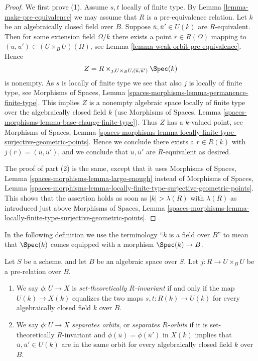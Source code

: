 \begin{proof}
We first prove (1). Assume $s, t$ locally of finite type. By
Lemma \ref{lemma-make-pre-equivalence}
we may assume that $R$ is a pre-equivalence relation.
Let $k$ be an algebraically closed field over $B$.
Suppose $\overline{u}, \overline{u}' \in U(k)$ are $R$-equivalent.
Then for some extension field $\Omega/k$ there exists
a point $\overline{r} \in R(\Omega)$ mapping to
$(\overline{u}, \overline{u}') \in (U \times_B U)(\Omega)$, see
Lemma \ref{lemma-weak-orbit-pre-equivalence}.
Hence
$$
Z = R \times_{j, U \times_B U, (\overline{u}, \overline{u}')} \Spec(k)
$$
is nonempty. As $s$ is locally of finite type we see that
also $j$ is locally of finite type, see
Morphisms of Spaces, Lemma \ref{spaces-morphisms-lemma-permanence-finite-type}.
This implies $Z$ is a nonempty algebraic space locally of finite type
over the algebraically closed field $k$ (use
Morphisms of Spaces,
Lemma \ref{spaces-morphisms-lemma-base-change-finite-type}).
Thus $Z$ has a $k$-valued point, see
Morphisms of Spaces, Lemma
\ref{spaces-morphisms-lemma-locally-finite-type-surjective-geometric-points}.
Hence we conclude there exists a $\overline{r} \in R(k)$ with
$j(\overline{r}) = (\overline{u}, \overline{u}')$, and we conclude that
$\overline{u}, \overline{u}'$ are $R$-equivalent as desired.

\medskip\noindent
The proof of part (2) is the same, except that it uses
Morphisms of Spaces, Lemma
\ref{spaces-morphisms-lemma-large-enough}
instead of
Morphisms of Spaces, Lemma
\ref{spaces-morphisms-lemma-locally-finite-type-surjective-geometric-points}.
This shows that the assertion holds as soon as $|k| > \lambda(R)$ with
$\lambda(R)$ as introduced just above
Morphisms of Spaces, Lemma
\ref{spaces-morphisms-lemma-locally-finite-type-surjective-geometric-points}.
\end{proof}

\noindent
In the following definition we use the terminology ``$k$ is a field
over $B$'' to mean that $\Spec(k)$ comes equipped with a morphism
$\Spec(k) \to B$.

\begin{definition}
\label{definition-set-theoretically-invariant}
Let $S$ be a scheme, and let $B$ be an algebraic space over $S$.
Let $j : R \to U \times_B U$ be a pre-relation over $B$.
\begin{enumerate}
\item We say $\phi : U \to X$ is {\it set-theoretically $R$-invariant}
if and only if the map $U(k) \to X(k)$ equalizes the two maps
$s, t : R(k) \to U(k)$ for every algebraically closed field $k$
over $B$.
\item We say $\phi : U \to X$ {\it separates orbits}, or
{\it separates $R$-orbits} if it is set-theoretically $R$-invariant and
$\phi(\overline{u}) = \phi(\overline{u}')$ in $X(k)$ implies that
$\overline{u}, \overline{u}' \in U(k)$ are in the same orbit
for every algebraically closed field $k$ over $B$.
\end{enumerate}
\end{definition}


